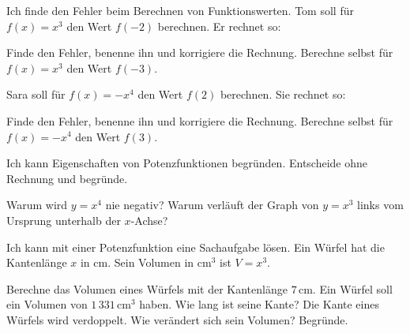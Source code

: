\begin{aufgabe}{Ich finde den Fehler beim Berechnen von Funktionswerten. Tom soll für $f(x) = x^3$ den Wert $f(-2)$ berechnen. Er rechnet so:}
\begin{teile}
\teil Finde den Fehler, benenne ihn und korrigiere die Rechnung.
\teil Berechne selbst für $f(x) = x^3$ den Wert $f(-3)$. \quad \leerfeld
\end{teile}
Sara soll für $f(x) = -x^4$ den Wert $f(2)$ berechnen. Sie rechnet so:
\begin{teile}
\teil Finde den Fehler, benenne ihn und korrigiere die Rechnung.
\teil Berechne selbst für $f(x) = -x^4$ den Wert $f(3)$. \quad \leerfeld
\end{teile}
\end{aufgabe}

\begin{aufgabe}{Ich kann Eigenschaften von Potenzfunktionen begründen. Entscheide ohne Rechnung und begründe.}
\begin{teile}
\teil Warum wird $y = x^4$ nie negativ?
\teil Warum verläuft der Graph von $y = x^3$ links vom Ursprung unterhalb der $x$-Achse?
\end{teile}
\end{aufgabe}

\begin{aufgabe}{Ich kann mit einer Potenzfunktion eine Sachaufgabe lösen. Ein Würfel hat die Kantenlänge $x$ in cm. Sein Volumen in $\text{cm}^3$ ist $V = x^3$.}
\begin{teile}
\teil Berechne das Volumen eines Würfels mit der Kantenlänge $7\,\text{cm}$. \quad \leerfeld[$\text{cm}^3$]
\teil Ein Würfel soll ein Volumen von $1\,331\,\text{cm}^3$ haben. Wie lang ist seine Kante? \quad \leerfeld[cm]
\teil Die Kante eines Würfels wird verdoppelt. Wie verändert sich sein Volumen? Begründe.
\end{teile}
\end{aufgabe}
